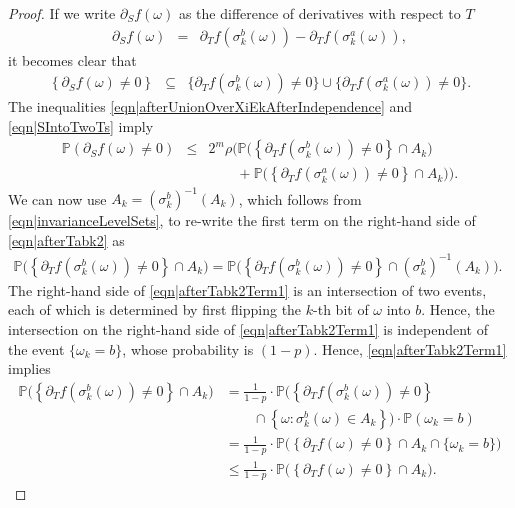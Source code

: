 \documentclass[reqno]{amsart}
\begin{document}
\begin{proof}
If we write $\partial_Sf(\omega)$ as the difference of derivatives with respect to $T$
\begin{eqnarray*}
\partial_Sf(\omega)&=&\partial_Tf\left(\sigma_k^b(\omega)\right)-\partial_Tf\left(\sigma_k^a(\omega)\right),
\end{eqnarray*}
it becomes clear that \begin{eqnarray} \left\{\partial_Sf(\omega)\neq 0\right\}&\subseteq&
\Big\{\partial_Tf\left(\sigma_k^b(\omega)\right)\neq 0\Big\}\cup
\Big\{\partial_Tf\left(\sigma_k^a(\omega)\right)\neq 0\Big\}. \label{eqn|SIntoTwoTs}
\end{eqnarray}
The inequalities \eqref{eqn|afterUnionOverXiEkAfterIndependence}
and \eqref{eqn|SIntoTwoTs} imply
\begin{eqnarray}
\mathbb P\left(\partial_Sf(\omega)\neq 0\right)&\leq&  
 2^m\rho\Big( \mathbb P\Big(\left\{\partial_Tf\left(\sigma_k^b(\omega)\right)\neq 0\right\} \cap A_k\Big) \nonumber \\
 &&\quad\quad
 +
 \mathbb P\Big(\left\{\partial_Tf\left(\sigma_k^a(\omega)\right)\neq 0\right\} \cap A_k\Big)\Big) \label{eqn|afterTabk2}.
 \end{eqnarray}
We can now use $A_k=(\sigma_k^b)^{-1}(A_k)$, which follows from \eqref{eqn|invarianceLevelSets}, to re-write the first term on the right-hand side of \eqref{eqn|afterTabk2} as
\begin{eqnarray}
\mathbb P\Big(\left\{\partial_Tf\left(\sigma_k^b(\omega)\right)\neq 0\right\} \cap A_k\Big) =
\mathbb P\Big(\left\{\partial_Tf\left(\sigma_k^b(\omega)\right)\neq 0\right\}  
   \cap \left(\sigma_k^b\right)^{-1}\left(A_k\right)\Big). &&\label{eqn|afterTabk2Term1}
\end{eqnarray}
The right-hand side of \eqref{eqn|afterTabk2Term1} is an intersection of two events, each of which is determined by first flipping the $k$-th bit of $\omega$ into $b$. Hence, the intersection on the right-hand side of \eqref{eqn|afterTabk2Term1} is independent of the event $\{\omega_k=b\}$, whose probability is $(1-p)$. 
Hence, \eqref{eqn|afterTabk2Term1} implies 
\begin{align}
\mathbb P\Big(\left\{\partial_Tf\left(\sigma_k^b(\omega)\right)\neq 0\right\} \cap A_k\Big)&=
\frac1{1-p}\cdot \mathbb P\Big(\left\{\partial_Tf\left(\sigma_k^b(\omega)\right)\neq 0\right\} \nonumber \\
&\quad\quad  \cap \left\{\omega:  \sigma_k^b(\omega)\in A_k\right\}\Big)\cdot \mathbb P(\omega_k=b)
\nonumber \\
&= 
\frac1{1-p}\cdot \mathbb P\Big(\left\{\partial_Tf(\omega)\neq 0\right\} \cap A_k \cap \{\omega_k=b\}\Big) \nonumber \\
&\leq 
\frac1{1-p}\cdot \mathbb P\Big(\left\{\partial_Tf(\omega)\neq 0\right\} \cap A_k\Big) 
. \label{eqn|afterTabk2Term1Bound}
\end{align}


\end{proof}
\end{document}
